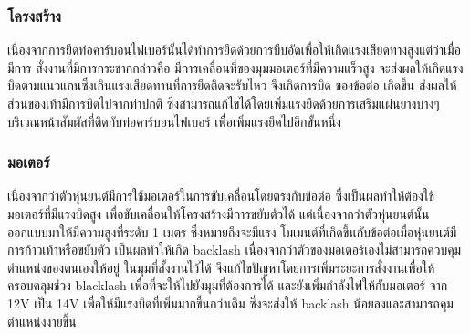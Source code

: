 \subsubsection{โครงสร้าง}
เนื่องจากการยึดท่อคาร์บอนไฟเบอร์นั้นได้ทำการยึดด้วยการบีบอัดเพื่อให้เกิดแรงเสียดทางสูงแต่ว่าเมื่อมีการ สั่งงานที่มีการกระชากกล่าวคือ
มีการเคลื่อนที่ของมุมมอเตอร์ที่มีความแร็วสูง จะส่งผลให้เกิดแรงบิดตามแนวแกนซึ่งเกินแรงเสียดทานที่การยึดติดจะรับไหว จึงเกิดการบิด ของข้อต่อ
เกิดขึ้น ส่งผลให้ ส่วนของเท้ามีการบิดไปจากท่าปกติ ซึ่งสามารถแก้ไขได้โดยเพิ่มแรงยึดด้วยการเสริมแผ่นยางบางๆบริเวณหน้าสัมผัสที่ติดกับท่อคาร์บอนไฟเบอร์
เพื่อเพิ่มแรงยึดไปอีกขั้นหนึ่ง 
\subsubsection{มอเตอร์}
เนื่องจากว่าตัวหุ่นยนต์มีการใช้มอเตอร์ในการขับเคลื่อนโดยตรงกับข้อต่อ ซึ่งเป็นผลทำให้ต้องใช้มอเตอร์ที่มีแรงบิดสูง
เพื่อขับเคลื่อนให้โครงสร้างมีการขยับตัวได้ แต่เนื่องจากว่าตัวหุ่นยนต์นั้นออกแบบมาให้มีความสูงที่ระดับ 1 เมตร ซึ่งหมายถึงจะมีแรง
โมเมนต์ที่เกิดขึ้นกับข้อต่อเมื่อหุ่นยนต์มีการก้าวเท้าหรือขยับตัว เป็นผลทำให้เกิด backlash เนื่องจากว่าตัวของมอเตอร์เองไม่สามารถควบคุมตำแหน่งของตนเองให้อยู่
ในมุมที่สั้งงานไว้ได้ จึงแก้ไขปัญหาโดยการเพิ่มระยะการสั่งงานเพื่อให้ครอบคลุมช่วง blacklash เพื่อที่จะให้ไปยังมุมที่ต้องการได้ และยังเพิ่มกำลังไฟให้กับมอเตอร์
จาก 12V เป็น 14V เพื่อให้มีแรงบิดที่เพิ่มมากขึ้นกว่าเดิม ซึ่งจะส่งให้ backlash น้อยลงและสามารถคุมตำแหน่งงายขึ้น


